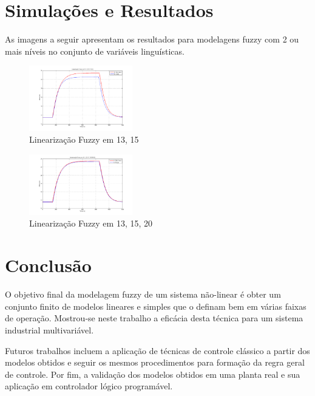 \documentclass[a0,portrait]{a0poster}
\begin{document}
\begin{multicols}{2}
\section*{Simulações e Resultados}

\color{Black}

As imagens a seguir apresentam os resultados para modelagens fuzzy com 2 ou mais níveis no conjunto de variáveis linguísticas.

\begin{figure}[H]
	\centering
	\includegraphics[width=0.4\textwidth]{imgs/v2_linear_fuzzy_13_15.png}
	\caption{Linearização Fuzzy em {13, 15}}
	\label{figFuzzy13_15}
\end{figure}

\begin{figure}[H]
	\centering
	\includegraphics[width=0.4\textwidth]{imgs/v2_linear_fuzzy_13_15_20.png}
	\caption{Linearização Fuzzy em {13, 15, 20}}
	\label{figFuzzy13_15_20}
\end{figure}

\color{DarkSlateGray} %

\section*{Conclusão}

\color{Black}

O objetivo final da modelagem fuzzy de um sistema não-linear é obter um conjunto finito de modelos lineares e simples que o definam bem em várias faixas de operação.  Mostrou-se neste trabalho a eficácia desta técnica para um sistema industrial multivariável. 

Futuros trabalhos incluem a aplicação de técnicas de controle clássico a partir dos modelos obtidos e seguir os mesmos procedimentos para formação da regra geral de controle. Por fim, a validação dos modelos obtidos em uma planta real e sua aplicação em controlador lógico programável.



\end{multicols}
\end{document}
